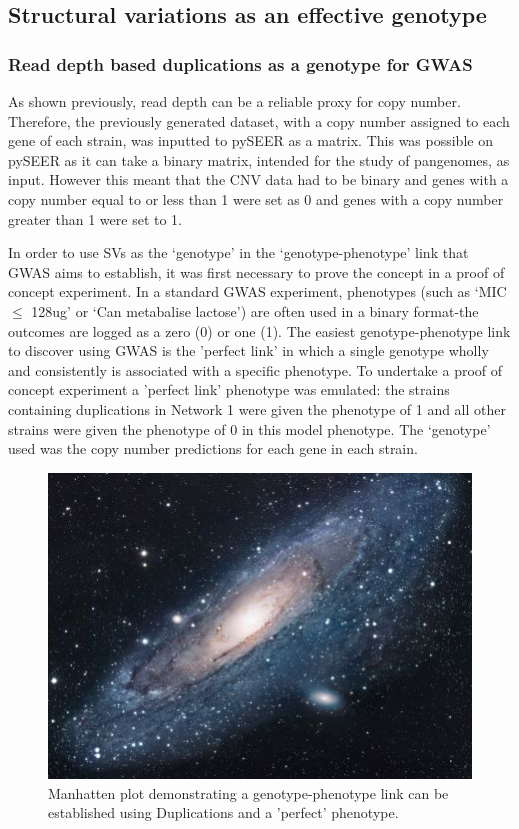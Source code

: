 \documentclass{article}
\begin{document}
\subsection{Structural variations as an effective genotype}


\subsubsection{Read depth based duplications as a genotype for GWAS}

As shown previously, read depth can be a reliable proxy for copy number. Therefore, the previously generated dataset, with a copy number assigned to each gene of each strain, was inputted to pySEER as a matrix. This was possible on pySEER as it can take a binary matrix, intended for the study of pangenomes, as input. However this meant that the CNV data had to be binary and genes with a copy number equal to or less than 1 were set as 0 and genes with a copy number greater than 1 were set to 1.


In order to use SVs as the ‘genotype’ in the ‘genotype-phenotype’ link that GWAS aims to establish, it was first necessary to prove the concept in a proof of concept experiment. In a standard GWAS experiment, phenotypes (such as `MIC $\leq$ 128ug' or `Can metabalise lactose') are often used in a binary format-the outcomes are logged as a zero (0) or one (1). The easiest genotype-phenotype link to discover using GWAS is the 'perfect link' in which a single genotype wholly and consistently is associated with a specific phenotype. To undertake a proof of concept experiment a 'perfect link' phenotype was emulated: the strains containing duplications in Network 1 were given the phenotype of 1 and all other strains were given the phenotype of 0 in this model phenotype. The `genotype' used was the copy number predictions for each gene in each strain.


\begin{figure}[h!]
\centering
\includegraphics[scale=1.7]{universe}
\caption{Manhatten plot demonstrating a genotype-phenotype link can be established using Duplications and a 'perfect' phenotype. }
\label{fig:Manhatten_1}
\end{figure}
\end{document}

